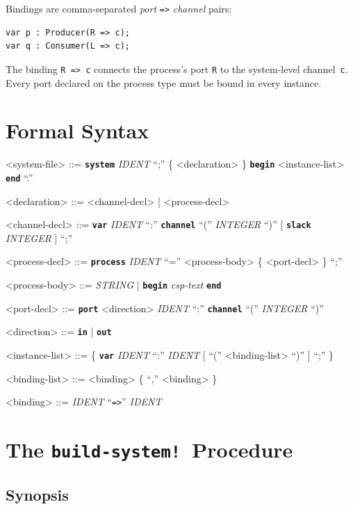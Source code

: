 \documentclass[11pt]{article}
\newcommand{\keyword}[1]{\texttt{\textbf{#1}}}
\newcommand{\nonterminal}[1]{\textit{#1}}
\begin{document}
Bindings are comma-separated \nonterminal{port} \verb!=>!
\nonterminal{channel} pairs:

\begin{Verbatim}[samepage=true]
var p : Producer(R => c);
var q : Consumer(L => c);
\end{Verbatim}

The binding \verb!R => c! connects the process's port \texttt{R}
to the system-level channel~\texttt{c}.  Every port declared on
the process type must be bound in every instance.

\section{Formal Syntax}

\begin{grammar}
<system-file> ::= \keyword{system} \nonterminal{IDENT} ``;'' \{ <declaration> \}
\keyword{begin} <instance-list> \keyword{end} ``.''

<declaration> ::= <channel-decl> | <process-decl>

<channel-decl> ::= \keyword{var} \nonterminal{IDENT} ``:'' \keyword{channel}
``('' \nonterminal{INTEGER} ``)'' [ \keyword{slack} \nonterminal{INTEGER} ] ``;''

<process-decl> ::= \keyword{process} \nonterminal{IDENT} ``='' <process-body>
\{ <port-decl> \} ``;''

<process-body> ::= \nonterminal{STRING} | \keyword{begin} \nonterminal{csp-text} \keyword{end}

<port-decl> ::= \keyword{port} <direction> \nonterminal{IDENT} ``:'' \keyword{channel}
``('' \nonterminal{INTEGER} ``)''

<direction> ::= \keyword{in} | \keyword{out}

<instance-list> ::= \{ \keyword{var} \nonterminal{IDENT} ``:'' \nonterminal{IDENT}
[ ``('' <binding-list> ``)'' ] ``;'' \}

<binding-list> ::= <binding> \{ ``,'' <binding> \}

<binding> ::= \nonterminal{IDENT} ``\verb!=>!'' \nonterminal{IDENT}
\end{grammar}

\section{The \texttt{build-system!}\ Procedure}

\subsection{Synopsis}
\end{document}
